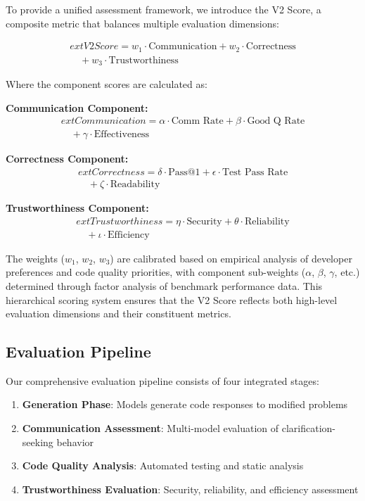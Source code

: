 \documentclass[conference]{IEEEtran}
\begin{document}
To provide a unified assessment framework, we introduce the V2 Score, a composite metric that balances multiple evaluation dimensions:

\begin{multline}
	ext{V2 Score} = w_1 \cdot \text{Communication} + w_2 \cdot \text{Correctness} \\
\quad + w_3 \cdot \text{Trustworthiness}
\end{multline}

Where the component scores are calculated as:

\textbf{Communication Component:}
\begin{multline}
	ext{Communication} = \alpha \cdot \text{Comm Rate} + \beta \cdot \text{Good Q Rate} \\
\quad + \gamma \cdot \text{Effectiveness}
\end{multline}

\textbf{Correctness Component:}
\begin{multline}
	ext{Correctness} = \delta \cdot \text{Pass@1} + \epsilon \cdot \text{Test Pass Rate} \\
\quad + \zeta \cdot \text{Readability}
\end{multline}

\textbf{Trustworthiness Component:}
\begin{multline}
	ext{Trustworthiness} = \eta \cdot \text{Security} + \theta \cdot \text{Reliability} \\
\quad + \iota \cdot \text{Efficiency}
\end{multline}

The weights ($w_1$, $w_2$, $w_3$) are calibrated based on empirical analysis of developer preferences and code quality priorities, with component sub-weights ($\alpha$, $\beta$, $\gamma$, etc.) determined through factor analysis of benchmark performance data. This hierarchical scoring system ensures that the V2 Score reflects both high-level evaluation dimensions and their constituent metrics.

\subsection{Evaluation Pipeline}

Our comprehensive evaluation pipeline consists of four integrated stages:

\begin{enumerate}
    \item \textbf{Generation Phase}: Models generate code responses to modified problems
    \item \textbf{Communication Assessment}: Multi-model evaluation of clarification-seeking behavior
    \item \textbf{Code Quality Analysis}: Automated testing and static analysis
    \item \textbf{Trustworthiness Evaluation}: Security, reliability, and efficiency assessment
\end{enumerate}
\end{document}
